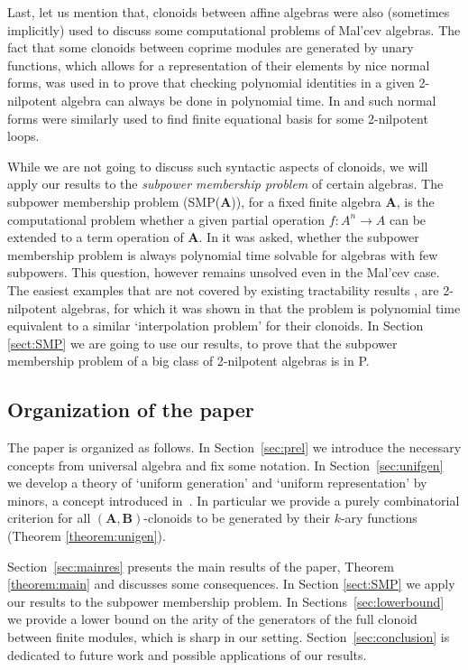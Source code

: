 \documentclass[11pt]{amsart}
\theoremstyle{plain}
\theoremstyle{definition}
\newcommand{\alg}[1]{\mathbf{#1}}
\newcommand{\algA}{\alg{A}}
\newcommand{\algB}{\alg{B}}
\begin{document}
Last, let us mention that, clonoids between affine algebras were also (sometimes implicitly) used to discuss some computational problems of Mal'cev algebras. The fact that some clonoids between coprime modules are generated by unary functions, which allows for a representation of their elements by nice normal forms, was used in \cite{KKK-CEQV2nil} to prove that checking polynomial identities in a given 2-nilpotent algebra can always be done in polynomial time. In \cite{mayr-VLloop} and \cite{KompatscherMayr2026} such normal forms were similarly used to find finite equational basis for some 2-nilpotent loops.

While we are not going to discuss such syntactic aspects of clonoids, we will apply our results to the \emph{subpower membership problem} of certain algebras. The subpower membership problem (SMP($\algA$)), for a fixed finite algebra $\algA$, is the computational problem whether a given partial operation $f\colon A^n \to A$ can be extended to a term operation of $\algA$. In \cite{IMMVW-subpowers} it was asked, whether the subpower membership problem is always polynomial time solvable for algebras with few subpowers. This question, however remains unsolved even in the Mal'cev case. The easiest examples that are not covered by existing tractability results \cite{mayr-SMP, BMS-SMP}, are 2-nilpotent algebras, for which it was shown in \cite{kompatscher-SMP2nil} that the problem is polynomial time equivalent to a similar `interpolation problem' for their clonoids. In Section \ref{sect:SMP} we are going to use our results, to prove that the subpower membership problem of a big class of 2-nilpotent algebras is in P.


\subsection*{Organization of the paper}

The paper is organized as follows. In Section~\ref{sec:prel} we introduce the necessary concepts from universal algebra and fix some notation. In Section~\ref{sec:unifgen} we develop a theory of `uniform generation' and `uniform representation' by minors, a concept introduced in~\cite{MW-clonoidsmodules}. In particular we provide a purely combinatorial criterion for all $(\algA,\algB)$-clonoids to be generated by their $k$-ary functions (Theorem \ref{theorem:unigen}).

Section~\ref{sec:mainres} presents the main results of the paper, Theorem \ref{theorem:main} and discusses some consequences. In Section \ref{sect:SMP} we apply our results to the subpower membership problem. In Sections~\ref{sec:lowerbound} we provide a lower bound on the arity of the generators of the full clonoid between finite modules, which is sharp in our setting. Section~\ref{sec:conclusion} is dedicated to future work and possible applications of our results.
\end{document}
